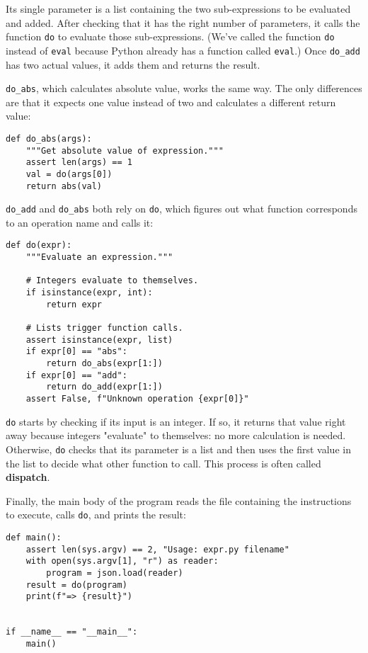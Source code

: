 \documentclass{scrbook}
\newcommand{\glossref}[1]{\textbf{#1}}
\begin{document}
\noindent Its single parameter is a list containing
the two sub-expressions to be evaluated and added.
After checking that it has the right number of parameters,
it calls the function \texttt{do} to evaluate those sub-expressions.
(We've called the function \texttt{do} instead of \texttt{eval}
because Python already has a function called \texttt{eval}.)
Once \texttt{do\_add} has two actual values,
it adds them and returns the result.



\texttt{do\_abs}, which calculates absolute value,
works the same way.
The only differences are that it expects one value instead of two
and calculates a different return value:


\begin{lstlisting}[frame=single,frameround=tttt]
def do_abs(args):
    """Get absolute value of expression."""
    assert len(args) == 1
    val = do(args[0])
    return abs(val)
\end{lstlisting}



\texttt{do\_add} and \texttt{do\_abs} both rely on \texttt{do},
which figures out what function corresponds to an operation name
and calls it:


\begin{lstlisting}[frame=single,frameround=tttt]
def do(expr):
    """Evaluate an expression."""

    # Integers evaluate to themselves.
    if isinstance(expr, int):
        return expr

    # Lists trigger function calls.
    assert isinstance(expr, list)
    if expr[0] == "abs":
        return do_abs(expr[1:])
    if expr[0] == "add":
        return do_add(expr[1:])
    assert False, f"Unknown operation {expr[0]}"
\end{lstlisting}



\texttt{do} starts by checking if its input is an integer.
If so,
it returns that value right away
because integers "evaluate" to themselves:
no more calculation is needed.
Otherwise,
\texttt{do} checks that its parameter is a list
and then uses the first value in the list
to decide what other function to call.
This process is often called \glossref{dispatch}.


Finally,
the main body of the program reads
the file containing the instructions to execute,
calls \texttt{do},
and prints the result:


\begin{lstlisting}[frame=single,frameround=tttt]
def main():
    assert len(sys.argv) == 2, "Usage: expr.py filename"
    with open(sys.argv[1], "r") as reader:
        program = json.load(reader)
    result = do(program)
    print(f"=> {result}")


if __name__ == "__main__":
    main()
\end{lstlisting}
\end{document}
